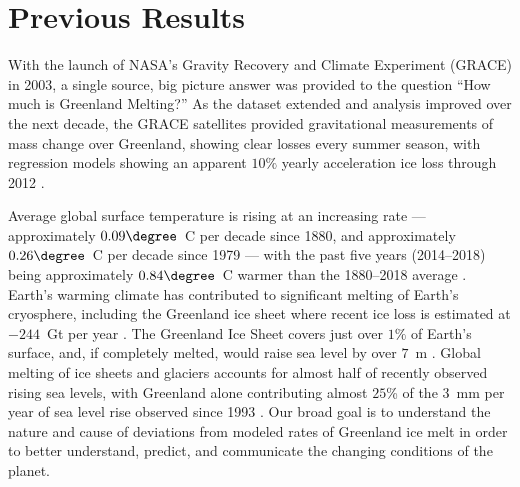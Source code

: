 \documentclass[11pt]{report}
\begin{document}
\section{Previous Results}

With the launch of NASA's Gravity Recovery and Climate Experiment (GRACE) in 2003, a single source, big picture answer was provided to the question ``How much is Greenland Melting?'' As the dataset extended and analysis improved over the next decade, the GRACE satellites provided gravitational measurements of mass change over Greenland, showing clear losses every summer season, with regression models showing an apparent $10\%$ yearly acceleration ice loss through 2012
\cite[][]{velicogna2009,angelen2014,enderlin2014,Harig+2016,bevis2019}. 

Average global surface temperature is rising at an increasing rate --- approximately $0.09\degree$~C per decade since 1880, and approximately $0.26\degree$~C per decade since 1979 \cite[][]{ipcc2013_atmosphere}
--- with the past five years (2014--2018) being approximately $0.84\degree$~C warmer than the 1880--2018 average \cite[][]{NOAA_stateofclimate}. Earth's warming climate has contributed to significant melting of Earth's cryosphere, including the Greenland ice sheet where recent ice loss is estimated at $-244$~Gt per
year \cite[][]{ipcc2013_cryosphere,Harig+2015a,Harig+2016}. The Greenland Ice Sheet covers just over $1\%$ of
Earth's surface, and, if completely melted, would raise sea level by over $7$~m
\cite[][]{ipcc2013_cryosphere}.
Global melting of ice sheets and glaciers accounts for almost half of recently observed rising sea levels, with Greenland alone contributing almost $25$\% of the $3$~mm per year of sea level rise observed since 1993
\cite[][]{Nerem}.  Our broad goal is to understand the nature and cause of deviations from modeled rates of Greenland ice melt in order to better understand, predict, and communicate the changing conditions of the planet.
\end{document}
